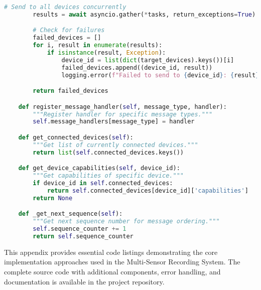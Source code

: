 \begin{lstlisting}[language=Python, caption=Network Communication Implementation]
        # Send to all devices concurrently
        results = await asyncio.gather(*tasks, return_exceptions=True)

        # Check for failures
        failed_devices = []
        for i, result in enumerate(results):
            if isinstance(result, Exception):
                device_id = list(dict(target_devices).keys())[i]
                failed_devices.append((device_id, result))
                logging.error(f"Failed to send to {device_id}: {result}")

        return failed_devices

    def register_message_handler(self, message_type, handler):
        """Register handler for specific message types."""
        self.message_handlers[message_type] = handler

    def get_connected_devices(self):
        """Get list of currently connected devices."""
        return list(self.connected_devices.keys())

    def get_device_capabilities(self, device_id):
        """Get capabilities of specific device."""
        if device_id in self.connected_devices:
            return self.connected_devices[device_id]['capabilities']
        return None

    def _get_next_sequence(self):
        """Get next sequence number for message ordering."""
        self.sequence_counter += 1
        return self.sequence_counter
\end{lstlisting}

This appendix provides essential code listings demonstrating the core implementation approaches used in the Multi-Sensor Recording System. The complete source code with additional components, error handling, and documentation is available in the project repository.
